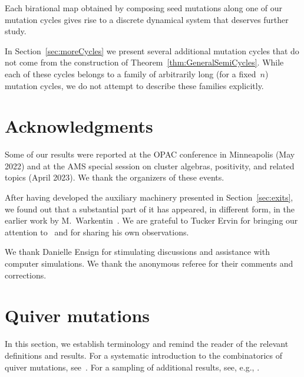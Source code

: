 \documentclass[11pt, letterpaper]{amsart}
\theoremstyle{definition}
\numberwithin{equation}{section}
\begin{document}
Each birational map obtained by composing seed mutations along one of our mutation cycles 
gives rise to a discrete dynamical system that deserves further study. 

In Section~\ref{sec:moreCycles} we present several additional mutation cycles 
that do not come from the construction of Theorem~\ref{thm:GeneralSemiCycles}. 
While each of these cycles belongs to a family of arbitrarily long (for a fixed~$n$) mutation cycles,
we do not attempt to describe these families explicitly. 

\medskip


\section*{Acknowledgments}
Some of our results were reported at the OPAC conference in Minneapolis (May 2022) and at the AMS special session on cluster algebras, positivity, and related topics (April 2023).
We thank the organizers of these events. 

After having developed the auxiliary machinery presented in Section~\ref{sec:exits},
we found out that a substantial part of it has appeared, in different form, in the earlier work by M.~Warkentin~\cite{Warkentin}. 
We are grateful to Tucker Ervin for bringing our attention to~\cite{Warkentin} and for sharing his own observations.

We thank Danielle Ensign for stimulating discussions and assistance with computer simulations. We thank the anonymous referee for their comments and corrections.

\clearpage

\newpage

\section{Quiver mutations}
\label{sec:quiver-mut}

In this section, we establish terminology and remind the reader of the relevant definitions and results. 
For a systematic introduction to the combinatorics of quiver mutations, see~\cite{FWZ}. 
For a sampling of additional results, see, e.g., \cite{BBH, Fordy-Marsh, Lawson-Mills, Warkentin}. 
\end{document}
